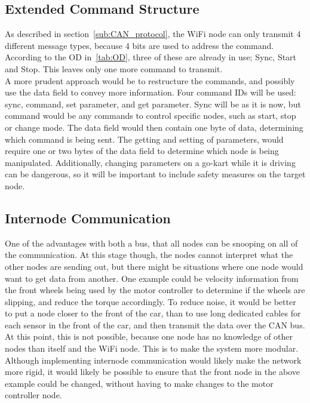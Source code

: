 \subsection*{Extended Command Structure}
As described in section~\ref{sub:CAN_protocol}, the WiFi node can only transmit 4 different message types, because 4 bits are used to address the command. 
According to the OD in~\ref{tab:OD}, three of these are already in use; Sync, Start and Stop. 
This leaves only one more command to transmit.\\

A more prudent approach would be to restructure the commands, and possibly use the data field to convey more information. 
Four command IDs will be used: sync, command, set parameter, and get parameter. 
Sync will be as it is now, but command would be any commands to control specific nodes, such as start, stop or change mode. 
The data field would then contain one byte of data, determining which command is being sent.
The getting and setting of parameters, would require one or two bytes of the data field to determine which node is being manipulated.
Additionally, changing parameters on a go-kart while it is driving can be dangerous, so it will be important to include safety measures on the target node.

\subsection*{Internode Communication}
One of the advantages with both a bus, that all nodes can be snooping on all of the communication.
At this stage though, the nodes cannot interpret what the other nodes are sending out, but there might be situations where one node would want to get data from another.
One example could be velocity information from the front wheels being used by the motor controller to determine if the wheels are slipping, and reduce the torque accordingly. 
To reduce noise, it would be better to put a node closer to the front of the car, than to use long dedicated cables for each sensor in the front of the car, and then transmit the data over the CAN bus.\\

At this point, this is not possible, because one node has no knowledge of other nodes than itself and the WiFi node. 
This is to make the system more modular.
Although implementing internode communication would likely make the network more rigid, it would likely be possible to ensure that the front node in the above example could be changed, without having to make changes to the motor controller node.

